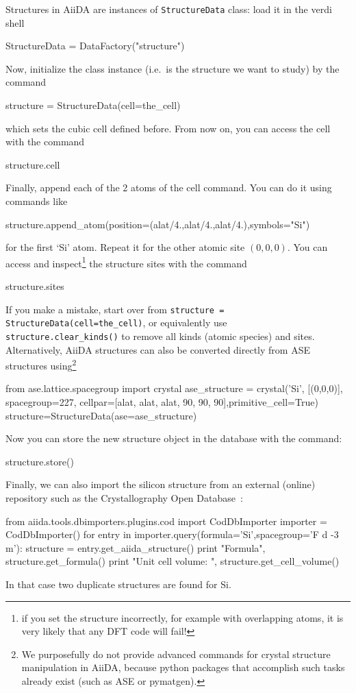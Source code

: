 Structures in AiiDA are instances of \texttt{StructureData} class: load it in the verdi shell
\begin{pythoncommand}
 StructureData = DataFactory("structure")
\end{pythoncommand}
Now, initialize the class instance (i.e.\ is the structure we want to study) by the command
\begin{pythoncommand}
 structure = StructureData(cell=the_cell)
\end{pythoncommand}
which sets the cubic cell defined before. From now on, you can access the cell with the command
\begin{pythoncommand}
 structure.cell
\end{pythoncommand}
Finally, append each of the 2 atoms of the cell command. You can do it
using commands like
\begin{pythoncommand}
 structure.append_atom(position=(alat/4.,alat/4.,alat/4.),symbols="Si")
\end{pythoncommand}
for the first `Si' atom. Repeat it for the other atomic site $\left(0,0,0\right)$.
You can access and inspect\footnote{if you set the structure incorrectly, for example with overlapping atoms, it is very likely that any DFT code will fail!} the structure sites with the command
\begin{pythoncommand}
 structure.sites
\end{pythoncommand}
If you make a mistake, start over from \texttt{structure = StructureData(cell=the\_cell)}, or equivalently use \\
\texttt{structure.clear\_kinds()} to remove all kinds (atomic species) and sites.
Alternatively, AiiDA structures can also be
converted directly from ASE~\cite{ref:ASE} structures using\footnote{We purposefully do not provide advanced commands
for crystal structure manipulation in AiiDA, because python packages that accomplish such tasks
already exist (such as ASE or pymatgen).}
\begin{pythoncommand}
 from ase.lattice.spacegroup import crystal
 ase_structure = crystal('Si', [(0,0,0)], spacegroup=227,
                 cellpar=[alat, alat, alat, 90, 90, 90],primitive_cell=True)
 structure=StructureData(ase=ase_structure)
\end{pythoncommand}
%
Now you can store the new structure object in the database with the command:
\begin{pythoncommand}
 structure.store()
\end{pythoncommand}
%
%
Finally, we can also import the silicon structure from an external (online) repository
such as the Crystallography Open Database~\cite{ref:COD}:
\begin{pythoncommand}
from aiida.tools.dbimporters.plugins.cod import CodDbImporter 
importer = CodDbImporter()
for entry in importer.query(formula='Si',spacegroup='F d -3 m'):
        structure = entry.get_aiida_structure()
        print "Formula", structure.get_formula()
        print "Unit cell volume: ", structure.get_cell_volume()
\end{pythoncommand}
In that case two duplicate structures are found for Si.

